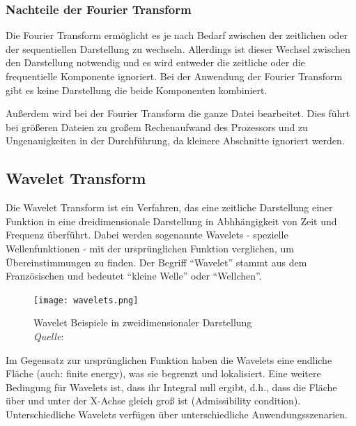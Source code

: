 %
\subsubsection{Nachteile der Fourier Transform}
\label{disadvantages_fourier}
%
    
Die Fourier Transform ermöglicht es je nach Bedarf zwischen der zeitlichen oder der sequentiellen Darstellung zu wechseln. Allerdings ist dieser Wechsel zwischen den Darstellung notwendig und es wird entweder die zeitliche oder die frequentielle Komponente ignoriert. Bei der Anwendung der Fourier Transform gibt es keine Darstellung die beide Komponenten kombiniert.

\par

Außerdem wird bei der Fourier Transform die ganze Datei bearbeitet. Dies führt bei größeren Dateien zu großem Rechenaufwand des Prozessors und zu Ungenauigkeiten in der Durchführung, da kleinere Abschnitte ignoriert werden.

%
\subsection{Wavelet Transform}
\label{wavelet-transformation}
%

Die Wavelet Transform ist ein Verfahren, das eine zeitliche Darstellung einer Funktion in eine dreidimensionale Darstellung in Abhhängigkeit von Zeit und Frequenz überführt. Dabei werden sogenannte Wavelets - spezielle Wellenfunktionen - mit der ursprünglichen Funktion verglichen, um Übereinstimmungen zu finden. Der Begriff \enquote{Wavelet} stammt aus dem Französischen und bedeutet \enquote{kleine Welle} oder \enquote{Wellchen}.

%
\begin{figure}[h]
    \texttt{[image: wavelets.png]}
    \caption{Wavelet Beispiele in zweidimensionaler Darstellung\\\hspace{\textwidth}\textit{Quelle}: \cite{wavelet_examples}}
    \label{fig:wavelet_examples}
\end{figure}
%

Im Gegensatz zur ursprünglichen Funktion haben die Wavelets eine endliche Fläche (auch: finite energy), was sie begrenzt und lokalisiert. Eine weitere Bedingung für Wavelets ist, dass ihr Integral null ergibt, d.h., dass die Fläche über und unter der X-Achse gleich groß ist (Admissibility condition). Unterschiedliche Wavelets verfügen über unterschiedliche Anwendungsszenarien.

